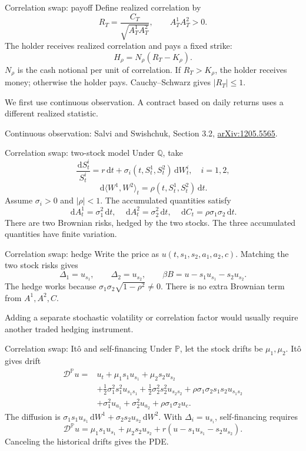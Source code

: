 \documentclass[handout,10pt,t,aspectratio=169]{beamer}
\newcommand{\Q}{\mathbb Q}
\newcommand{\Pp}{\mathbb P}
\newcommand{\dd}{\,\mathrm d}
\newcommand{\source}[1]{\vfill{\scriptsize\color{gray}#1\par}}
\begin{document}
\begin{frame}{Correlation swap: payoff}
\small
Define realized correlation by
\[
 R_T=\frac{C_T}{\sqrt{A_T^1A_T^2}},\qquad A_T^1A_T^2>0.
\]
The holder receives realized correlation and pays a fixed strike:
\[
 \boxed{H_\rho=N_\rho(R_T-K_\rho).}
\]
\(N_\rho\) is the cash notional per unit of correlation.
If \(R_T>K_\rho\), the holder receives money; otherwise the holder pays.
Cauchy--Schwarz gives \(|R_T|\leq1\).

\medskip
We first use continuous observation. A contract based on daily returns
uses a different realized statistic.
\source{Continuous observation: Salvi and Swishchuk, Section 3.2,
\href{https://arxiv.org/abs/1205.5565}{arXiv:1205.5565}.}
\end{frame}


\begin{frame}{Correlation swap: two-stock model}
\small
Under \(\Q\), take
\[
 \frac{\dd S_t^i}{S_t^i}=r\dd t+\sigma_i(t,S_t^1,S_t^2)\dd W_t^i,
 \quad i=1,2,
\]
\[
 \dd\langle W^1,W^2\rangle_t=\rho(t,S_t^1,S_t^2)\dd t.
\]
Assume \(\sigma_i>0\) and \(|\rho|<1\). The accumulated quantities satisfy
\[
 \dd A_t^1=\sigma_1^2\dd t,\quad
 \dd A_t^2=\sigma_2^2\dd t,\quad
 \dd C_t=\rho\sigma_1\sigma_2\dd t.
\]
There are two Brownian risks, hedged by the two stocks.
The three accumulated quantities have finite variation.
\end{frame}

\begin{frame}{Correlation swap: hedge}
\small
Write the price as \(u(t,s_1,s_2,a_1,a_2,c)\).
Matching the two stock risks gives
\[
 \boxed{\Delta_1=u_{s_1},\qquad\Delta_2=u_{s_2},\qquad
 \beta B=u-s_1u_{s_1}-s_2u_{s_2}.}
\]
The hedge works because \(\sigma_1\sigma_2\sqrt{1-\rho^2}\ne0\).
There is no extra Brownian term from \(A^1,A^2,C\).

\medskip
Adding a separate stochastic volatility or correlation factor would
usually require another traded hedging instrument.
\end{frame}

\begin{frame}{Correlation swap: It\^o and self-financing}
\small
Under \(\Pp\), let the stock drifts be \(\mu_1,\mu_2\). It\^o gives drift
\[
 \begin{aligned}
 \mathcal D^\Pp u={}&u_t+\mu_1s_1u_{s_1}+\mu_2s_2u_{s_2}\\
 &+\tfrac12\sigma_1^2s_1^2u_{s_1s_1}
 +\tfrac12\sigma_2^2s_2^2u_{s_2s_2}
 +\rho\sigma_1\sigma_2s_1s_2u_{s_1s_2}\\
 &+\sigma_1^2u_{a_1}+\sigma_2^2u_{a_2}+\rho\sigma_1\sigma_2u_c.
 \end{aligned}
\]
The diffusion is
\(\sigma_1s_1u_{s_1}\dd W^1+\sigma_2s_2u_{s_2}\dd W^2\).
With \(\Delta_i=u_{s_i}\), self-financing requires
\[
 \mathcal D^\Pp u=\mu_1s_1u_{s_1}+\mu_2s_2u_{s_2}
 +r(u-s_1u_{s_1}-s_2u_{s_2}).
\]
Canceling the historical drifts gives the PDE.
\end{frame}
\end{document}

